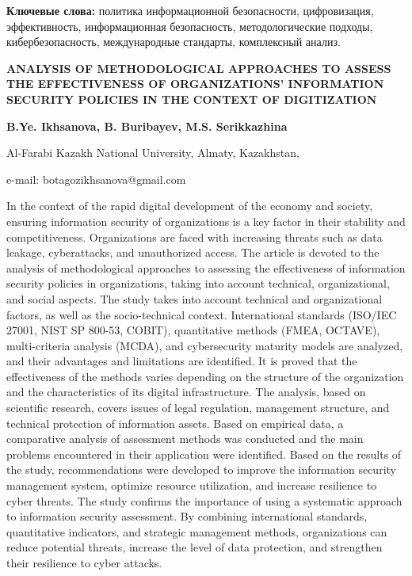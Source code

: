 {\bfseries Ключевые слова:} политика информационной безопасности,
цифровизация, эффективность, информационная безопасность,
методологические подходы, кибербезопасность, международные стандарты,
комплексный анализ.

\begin{articleheader}
{\bfseries ANALYSIS OF METHODOLOGICAL APPROACHES TO ASSESS THE
EFFECTIVENESS OF ORGANIZATIONS'{} INFORMATION SECURITY
POLICIES IN THE CONTEXT OF DIGITIZATION}

{\bfseries
B.Ye. Ikhsanova\textsuperscript{\envelope },
B. Buribayev,
M.S. Serikkazhina
}
\end{articleheader}

\begin{affiliation}
Al-Farabi Kazakh National University, Almaty, Kazakhstan,

e-mail: botagozikhsanova@gmail.com
\end{affiliation}

In the context of the rapid digital development of the economy and
society, ensuring information security of organizations is a key factor
in their stability and competitiveness. Organizations are faced with
increasing threats such as data leakage, cyberattacks, and unauthorized
access. The article is devoted to the analysis of methodological
approaches to assessing the effectiveness of information security
policies in organizations, taking into account technical,
organizational, and social aspects. The study takes into account
technical and organizational factors, as well as the socio-technical
context. International standards (ISO/IEC 27001, NIST SP 800-53, COBIT),
quantitative methods (FMEA, OCTAVE), multi-criteria analysis (MCDA), and
cybersecurity maturity models are analyzed, and their advantages and
limitations are identified. It is proved that the effectiveness of the
methods varies depending on the structure of the organization and the
characteristics of its digital infrastructure. The analysis, based on
scientific research, covers issues of legal regulation, management
structure, and technical protection of information assets. Based on
empirical data, a comparative analysis of assessment methods was
conducted and the main problems encountered in their application were
identified. Based on the results of the study, recommendations were
developed to improve the information security management system,
optimize resource utilization, and increase resilience to cyber threats.
The study confirms the importance of using a systematic approach to
information security assessment. By combining international standards,
quantitative indicators, and strategic management methods, organizations
can reduce potential threats, increase the level of data protection, and
strengthen their resilience to cyber attacks.

